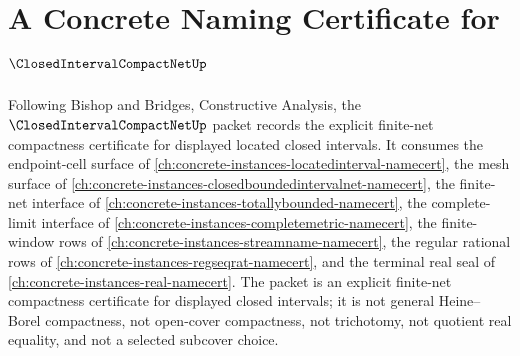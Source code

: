 \chapter{A Concrete Naming Certificate for $\ClosedIntervalCompactNetUp$}
\label{ch:concrete-instances-closed-interval-compact-net-namecert}

Following Bishop and Bridges, Constructive Analysis, the $\ClosedIntervalCompactNetUp$ packet records the explicit finite-net compactness certificate for displayed located closed intervals. It consumes the endpoint-cell surface of \autoref{ch:concrete-instances-locatedinterval-namecert}, the mesh surface of \autoref{ch:concrete-instances-closedboundedintervalnet-namecert}, the finite-net interface of \autoref{ch:concrete-instances-totallybounded-namecert}, the complete-limit interface of \autoref{ch:concrete-instances-completemetric-namecert}, the finite-window rows of \autoref{ch:concrete-instances-streamname-namecert}, the regular rational rows of \autoref{ch:concrete-instances-regseqrat-namecert}, and the terminal real seal of \autoref{ch:concrete-instances-real-namecert}. The packet is an explicit finite-net compactness certificate for displayed closed intervals; it is not general Heine--Borel compactness, not open-cover compactness, not trichotomy, not quotient real equality, and not a selected subcover choice.

